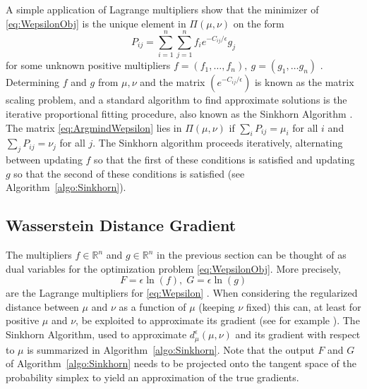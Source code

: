 \documentclass[conference]{IEEEtran}
\newcommand{\R}{{\mathbb{R}}}
\begin{document}
A simple application of Lagrange multipliers show that the minimizer of \eqref{eq:WepsilonObj} is the unique element in $\Pi(\mu,\nu)$ on the form
\begin{equation} P_{ij} = \sum_{i=1}^n \sum_{j=1}^n f_i e^{-C_{ij}/\epsilon} g_j \label{eq:ArgmindWepsilon} \end{equation}
for some unknown positive multipliers $f=(f_1,\ldots,f_n),\ g=(g_1,\ldots g_n)$ \cite{peyre}. Determining $f$ and $g$ from $\mu, \nu$ and the matrix $(e^{-C_{ij}/\epsilon})$ is known as the matrix scaling problem, and a standard algorithm to find approximate solutions is the iterative proportional fitting procedure, also known as the Sinkhorn Algorithm \cite{peyre}. The matrix \eqref{eq:ArgmindWepsilon} lies in $\Pi(\mu,\nu)$ if $\sum_i P_{ij} = \mu_i$ for all $i$ and $\sum_j P_{ij} = \nu_j$ for all $j$. The Sinkhorn algorithm proceeds iteratively, alternating between updating $f$ so that the first of these conditions is satisfied and updating  $g$ so that the second of these conditions is satisfied (see Algorithm~\ref{algo:Sinkhorn}).

\subsection{Wasserstein Distance Gradient}
The multipliers $f\in\R^n$ and $g\in\R^n$ in the previous section can be thought of as dual variables for the optimization problem \eqref{eq:WepsilonObj}. More precisely, 
$$ F = \epsilon \ln(f), \; G = \epsilon \ln(g) $$ 
are the Lagrange multipliers for \eqref{eq:Wepsilon} \cite{cuturi}. When considering the regularized distance between $\mu$ and $\nu$ as a function of $\mu$ (keeping $\nu$ fixed) this can, at least for positive $\mu$ and $\nu$, be exploited to approximate its gradient (see for example \cite{frogner, lellman}). The Sinkhorn Algorithm, used to approximate $d_\mu^\epsilon(\mu,\nu)$ and its gradient with respect to $\mu$ is summarized in Algorithm~\ref{algo:Sinkhorn}. Note that the output $F$ and $G$ of Algorithm~\ref{algo:Sinkhorn} needs to be projected onto the tangent space of the probability simplex to yield an approximation of the true gradients. 
\end{document}
